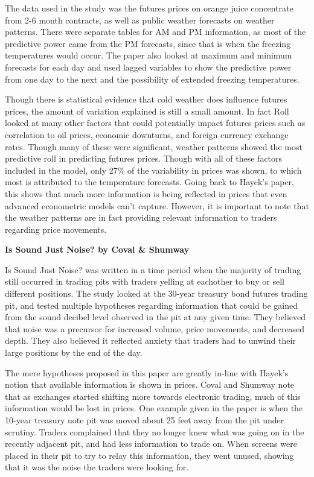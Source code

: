 \documentclass[11pt]{article}
\begin{document}
The data used in the study was the futures prices on orange juice
concentrate from 2-6 month contracts, as well as public weather
forecasts on weather patterns. There were separate tables for AM and PM
information, as most of the predictive power came from the PM forecasts,
since that is when the freezing temperatures would occur. The paper also
looked at maximum and minimum forecasts for each day and used lagged
variables to show the predictive power from one day to the next and the
possibility of extended freezing temperatures.

Though there is statistical evidence that cold weather does influence
futures prices, the amount of variation explained is still a small
amount. In fact Roll looked at many other factors that could potentially
impact futures prices such as correlation to oil prices, economic
downturns, and foreign currency exchange rates. Though many of these
were significant, weather patterns showed the most predictive roll in
predicting futures prices. Though with all of these factors included in
the model, only 27\% of the variability in prices was shown, to which
most is attributed to the temperature forecasts. Going back to Hayek's
paper, this shows that much more information is being reflected in
prices that even advanced econometric models can't capture. However, it
is important to note that the weather patterns are in fact providing
relevant information to traders regarding price movements.

    \textbf{Is Sound Just Noise? by Coval \& Shumway}

    Is Sound Just Noise? was written in a time period when the majority of
trading still occurred in trading pits with traders yelling at eachother
to buy or sell different positions. The study looked at the 30-year
treasury bond futures trading pit, and tested multiple hypotheses
regarding information that could be gained from the sound decibel level
observed in the pit at any given time. They believed that noise was a
precursor for increased volume, price movements, and decreased depth.
They also believed it reflected anxiety that traders had to unwind their
large positions by the end of the day.

The mere hypotheses proposed in this paper are greatly in-line with
Hayek's notion that available information is shown in prices. Coval and
Shumway note that as exchanges started shifting more towards electronic
trading, much of this information would be lost in prices. One example
given in the paper is when the 10-year treasury note pit was moved about
25 feet away from the pit under scrutiny. Traders complained that they
no longer knew what was going on in the recently adjacent pit, and had
less information to trade on. When screens were placed in their pit to
try to relay this information, they went unused, showing that it was the
noise the traders were looking for.
\end{document}
